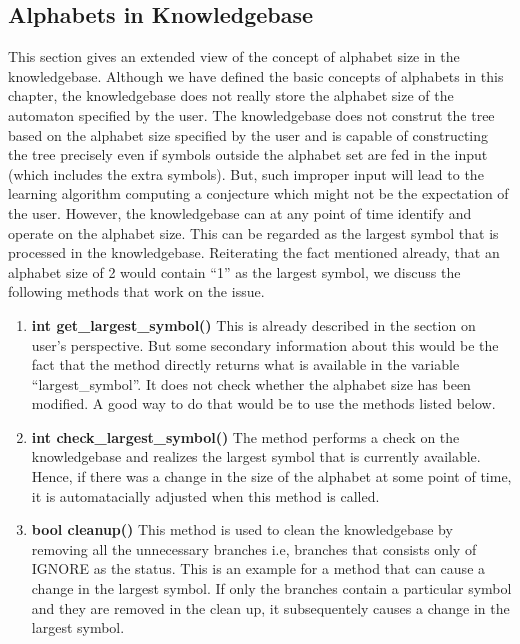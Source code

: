 \subsection*{Alphabets in Knowledgebase}
	This section gives an extended view of the concept of alphabet size in the knowledgebase. Although we have defined the basic concepts of alphabets in this chapter, the knowledgebase does not really store the alphabet size of the automaton specified by the user. The knowledgebase does not construt the tree based on the alphabet size specified by the user and is capable of constructing the tree precisely even if symbols outside the alphabet set are fed in the input (which includes the extra symbols). But, such improper input will lead to the learning algorithm computing a conjecture which might not be the expectation of the user.
	However, the knowledgebase can at any point of time identify and operate on the alphabet size. This can be regarded as the largest symbol that is processed in the knowledgebase. Reiterating the fact mentioned already, that an alphabet size of 2 would contain ``1'' as the largest symbol, we discuss the following methods that work on the issue.
\begin{enumerate}
\item \textbf{int get\_largest\_symbol()} \hfill \vskip 1pt
	This is already described in the section on user's perspective. But some secondary information about this would be the fact that the method directly returns what is available in the variable ``largest\_symbol''. It does not check whether the alphabet size has been modified. A good way to do that would be to use the methods listed below.
	
\item \textbf{int check\_largest\_symbol()} \hfill \vskip 1pt
	The method performs a check on the knowledgebase and realizes the largest symbol that is currently available. Hence, if there was a change in the size of the alphabet at some point of time, it is automatacially adjusted when this method is called.
	
\item \textbf{bool cleanup()} \hfill \vskip 1pt
	This method is used to clean the knowledgebase by removing all the unnecessary branches i.e, branches that consists only of IGNORE as the status. This is an example for a method that can cause a change in the largest symbol. If only the branches contain a particular symbol and they are removed in the clean up, it subsequentely causes a change in the largest symbol. 
\end{enumerate}

